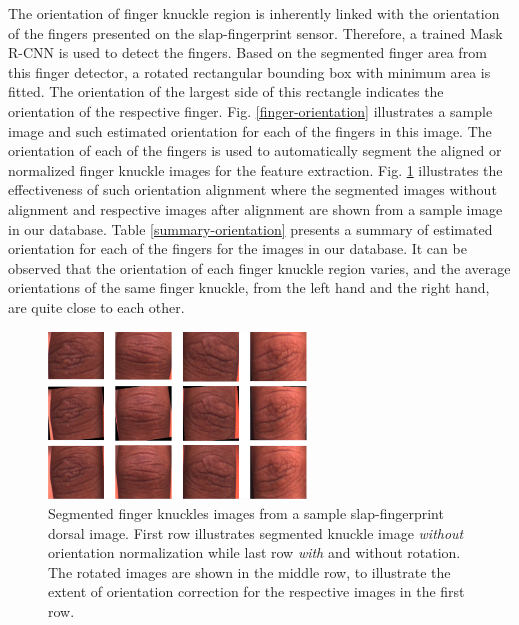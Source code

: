 The orientation of finger knuckle region is inherently linked with the orientation of the fingers presented on the slap-fingerprint sensor. Therefore, a trained Mask R-CNN is used to detect the fingers. Based on the segmented finger area from this finger detector, a rotated rectangular bounding box with minimum area is fitted. The orientation of the largest side of this rectangle indicates the orientation of the respective finger. Fig. \ref{finger-orientation} illustrates a sample image and such estimated orientation for each of the fingers in this image. The orientation of each of the fingers is used to automatically segment the aligned or normalized finger knuckle images for the feature extraction. Fig. \ref{orientaion-normlization} illustrates the effectiveness of such orientation alignment where the segmented images without alignment and respective images after alignment are shown from a sample image in our database. Table \ref{summary-orientation} presents a summary of estimated orientation for each of the fingers for the images in our database. It can be observed that the orientation of each finger knuckle region varies, and the average orientations of the same finger knuckle, from the left hand and the right hand, are quite close to each other.

\begin{figure}[ht]
    \centering
    \includegraphics[width=2.7in]{Figures/orientation-normization.png}
    \caption{Segmented finger knuckles images from a sample slap-fingerprint dorsal image. First row illustrates segmented knuckle image \textit{without} orientation normalization while last row \textit{with} and without rotation. The rotated images are shown in the middle row, to illustrate the extent of orientation correction for the respective images in the first row.}
    \label{orientaion-normlization}
\end{figure}


